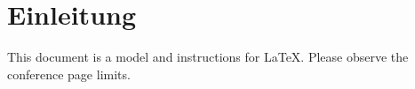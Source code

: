 \section{Einleitung}
This document is a model and instructions for \LaTeX.
Please observe the conference page limits. 